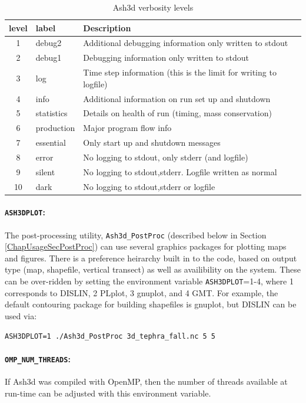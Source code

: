 \small
\begin{table}[htbp]
\begin{center}
\begin{tabular}{| c | l | l |}
\hline
level & label & Description \\
\hline
1& debug2      & Additional debugging information only written to stdout\\
2& debug1      & Debugging information only written to stdout\\
3& log         & Time step information (this is the limit for writing to logfile)\\
4& info        & Additional information on run set up and shutdown\\
5& statistics  & Details on health of run (timing, mass conservation)\\
6& production  & Major program flow info\\
7& essential   & Only start up and shutdown messages\\
8& error       & No logging to stdout, only stderr (and logfile)\\
9& silent      & No logging to stdout,stderr. Logfile written as normal\\
10& dark       & No logging to stdout,stderr or logfile\\
\hline
\end{tabular}
\caption{\label{tab:VerbosityLevels}Ash3d verbosity levels}
\end{center}
\end{table}
\normalsize

\paragraph{\texttt{ASH3DPLOT}:}
The post-processing utility, \texttt{Ash3d\_PostProc} (described below in
Section \ref{ChapUsageSecPostProc}) can use several graphics packages for
plotting maps and figures. There is a preference heirarchy built in to the
code, based on output type (map, shapefile, vertical transect) as well as
availibility on the system. These can be over-ridden by setting the
environment variable \texttt{ASH3DPLOT}=1-4, where 1 corresponds to DISLIN,
2 PLplot, 3 gnuplot, and 4 GMT. For example, the default contouring package
for building shapefiles is gnuplot, but DISLIN can be used via:

\texttt{ASH3DPLOT=1 ./Ash3d\_PostProc 3d\_tephra\_fall.nc 5 5}

\paragraph{\texttt{OMP\_NUM\_THREADS}:}
If Ash3d was compiled with OpenMP, then the number of threads available
at run-time can be adjusted with this environment variable.

